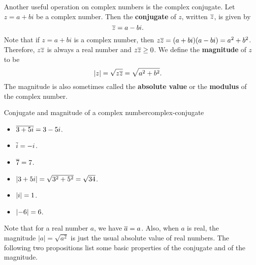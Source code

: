 Another useful operation on complex numbers is the complex
conjugate. Let $z = a+bi$ be a complex number. Then the
\textbf{conjugate}%
%
%
 of $z$, written $\overline{z}$, is given by
\begin{equation*}
  \overline{z} = a-bi.
\end{equation*}
Note that if $z=a+bi$ is a complex number, then
$z\overline{z} = (a+bi)(a-bi) = a^2+b^2$. Therefore, $z\overline{z}$
is always a real number and $z\overline{z}\geq 0$. We define the
\textbf{magnitude}%
%
 of $z$ to be
\begin{equation*}
  \left|z\right| = \sqrt{z\overline{z}} = \sqrt{a^2+b^2}.
\end{equation*}
The magnitude is also sometimes called the \textbf{absolute value}%
%
 or the
\textbf{modulus}%
%
 of the complex
number.

\begin{example}{Conjugate and magnitude of a complex number}{complex-conjugate}
  \begin{itemize}
  \item $\overline{3+5i} = 3-5i$.
  \item $\overline{i} = -i$.
  \item $\overline{7} = 7$.
  \item $\left|3+5i\right| = \sqrt{3^2+5^2} = \sqrt{34}$.
  \item $\left|i\right| = 1$.
  \item $\left|-6\right| = 6$.
  \end{itemize}
\end{example}

Note that for a real number $a$, we have $\overline{a}=a$. Also, when
$a$ is real, the magnitude $|a| = \sqrt{a^2}$ is just the usual
absolute value of real numbers. The following two propositions
list some basic properties of the conjugate and of the magnitude.

